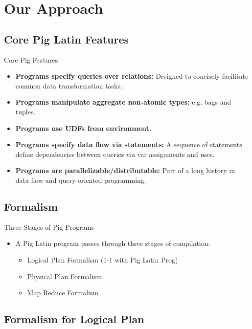 \section{Our Approach}

\subsection{Core Pig Latin Features}
\begin{frame}{Core Pig Features}
\begin{itemize}
	\item \textbf{Programs specify queries over relations:} Designed to
	concisely facilitate common data transformation tasks.
	\item \textbf{Programs manipulate aggregate non-atomic types:} e.g. bags
	and tuples.
	\item \textbf{Programs use UDFs from environment.}
	\item \textbf{Programs specify data flow via statements:} A sequence of
	statements define dependencies between queries via var assignments and uses.
	\item \textbf{Programs are parallelizable/distributable:} Part of a long
	history in data flow and query-oriented programming.
\end{itemize}
\end{frame}

\subsection{Formalism}
\begin{frame}{Three Stages of Pig Programs}
\begin{itemize}
	\item A Pig Latin program passes through three stages of compilation:
	\begin{itemize}
		\item Logical Plan Formalism (1-1 with Pig Latin Prog)
		\item Physical Plan Formalism
		\item Map Reduce Formalism
	\end{itemize}
\end{itemize}
\end{frame}

\subsection{Formalism for Logical Plan}

